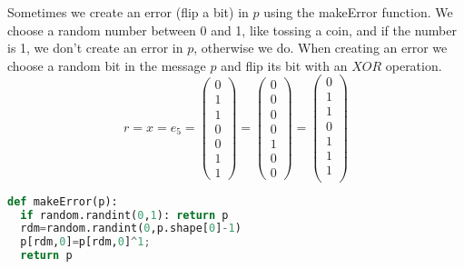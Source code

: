 \documentclass[12pt]{article}
\begin{document}
\newpage
\noindent Sometimes we create an error (flip a bit) in $p$ using the makeError function. We choose a random number between 0 and 1, like tossing a coin, and if the number is 1, we don't create an error in $p$, otherwise we do. When creating an error we choose a random bit in the message $p$ and flip its bit with an $XOR$ operation.
\[
r = x = e_5 = 
\begin{pmatrix}
  0 \\
  1 \\
  1 \\
  0 \\
  0 \\
  1 \\
  1 
\end{pmatrix} 
=
\begin{pmatrix}
  0 \\
  0 \\
  0 \\
  0 \\
  1 \\
  0 \\
  0 
\end{pmatrix} 
=
\begin{pmatrix}
  0 \\
  1 \\
  1 \\
  0 \\
  1 \\
  1 \\
  1 \\
\end{pmatrix} 
\]

\begin{lstlisting}[frame=single,language=Python,caption=makeError \label{code:makeMessage}]
def makeError(p): 
  if random.randint(0,1): return p
  rdm=random.randint(0,p.shape[0]-1)
  p[rdm,0]=p[rdm,0]^1;
  return p
\end{lstlisting}
\end{document}
